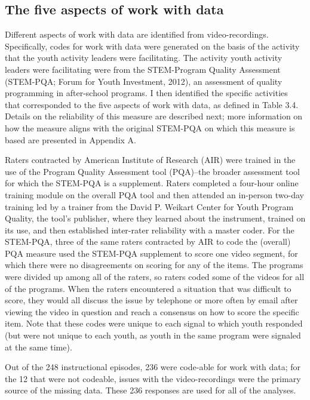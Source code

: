 \documentclass[]{msu-thesis}
\theoremstyle{definition}
\theoremstyle{definition}
\theoremstyle{definition}
\theoremstyle{remark}
\begin{document}
\subsection{The five aspects of work with
data}\label{the-five-aspects-of-work-with-data}

Different aspects of work with data are identified from
video-recordings. Specifically, codes for work with data were generated
on the basis of the activity that the youth activity leaders were
facilitating. The activity youth activity leaders were facilitating were
from the STEM-Program Quality Assessment (STEM-PQA; Forum for Youth
Investment, 2012), an assessment of quality programming in after-school
programs. I then identified the specific activities that corresponded to
the five aspects of work with data, as defined in Table 3.4. Details on
the reliability of this measure are described next; more information on
how the measure aligns with the original STEM-PQA on which this measure
is based are presented in Appendix A.

Raters contracted by American Institute of Research (AIR) were trained
in the use of the Program Quality Assessment tool (PQA)--the broader
assessment tool for which the STEM-PQA is a supplement. Raters completed
a four-hour online training module on the overall PQA tool and then
attended an in-person two-day training led by a trainer from the David
P. Weikart Center for Youth Program Quality, the tool's publisher, where
they learned about the instrument, trained on its use, and then
established inter-rater reliability with a master coder. For the
STEM-PQA, three of the same raters contracted by AIR to code the
(overall) PQA measure used the STEM-PQA supplement to score one video
segment, for which there were no disagreements on scoring for any of the
items. The programs were divided up among all of the raters, so raters
coded some of the videos for all of the programs. When the raters
encountered a situation that was difficult to score, they would all
discuss the issue by telephone or more often by email after viewing the
video in question and reach a consensus on how to score the specific
item. Note that these codes were unique to each signal to which youth
responded (but were not unique to each youth, as youth in the same
program were signaled at the same time).

Out of the 248 instructional episodes, 236 were code-able for work with
data; for the 12 that were not codeable, issues with the
video-recordings were the primary source of the missing data. These 236
responses are used for all of the analyses.
\end{document}
